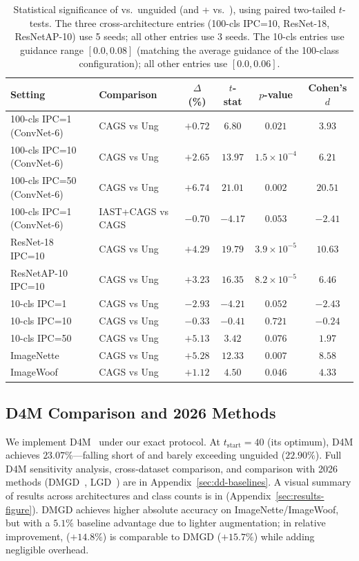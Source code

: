 \begin{table}[t]
\centering
\footnotesize
\caption{Statistical significance of \cags{} vs.\ unguided (and \iast{}+\cags{} vs.\ \cags{}), using paired two-tailed $t$-tests. The three cross-architecture entries (100-cls IPC=10, ResNet-18, ResNetAP-10) use 5 seeds; all other entries use 3 seeds. The 10-cls entries use guidance range $[0.0, 0.08]$ (matching the average guidance of the 100-class configuration); all other entries use $[0.0, 0.06]$.}
\label{tab:significance}
\begin{tabular}{llcccc}
\toprule
\textbf{Setting} & \textbf{Comparison} & \textbf{$\Delta$ (\%)} & \textbf{$t$-stat} & \textbf{$p$-value} & \textbf{Cohen's $d$} \\
\midrule
100-cls IPC=1 (ConvNet-6) & CAGS vs Ung & $+0.72$ & $6.80$ & $0.021$ & $3.93$ \\
100-cls IPC=10 (ConvNet-6) & CAGS vs Ung & $+2.65$ & $13.97$ & $1.5\!\times\!10^{-4}$ & $6.21$ \\
100-cls IPC=50 (ConvNet-6) & CAGS vs Ung & $+6.74$ & $21.01$ & $0.002$ & $20.51$ \\
100-cls IPC=1 (ConvNet-6) & IAST+CAGS vs CAGS & $-0.70$ & $-4.17$ & $0.053$ & $-2.41$ \\
\midrule
ResNet-18 IPC=10 & CAGS vs Ung & $+4.29$ & $19.79$ & $3.9\!\times\!10^{-5}$ & $10.63$ \\
ResNetAP-10 IPC=10 & CAGS vs Ung & $+3.23$ & $16.35$ & $8.2\!\times\!10^{-5}$ & $6.46$ \\
\midrule
10-cls IPC=1 & CAGS vs Ung & $-2.93$ & $-4.21$ & $0.052$ & $-2.43$ \\
10-cls IPC=10 & CAGS vs Ung & $-0.33$ & $-0.41$ & $0.721$ & $-0.24$ \\
10-cls IPC=50 & CAGS vs Ung & $+5.13$ & $3.42$ & $0.076$ & $1.97$ \\
\midrule
ImageNette & CAGS vs Ung & $+5.28$ & $12.33$ & $0.007$ & $8.58$ \\
ImageWoof & CAGS vs Ung & $+1.12$ & $4.50$ & $0.046$ & $4.33$ \\
\bottomrule
\end{tabular}
\end{table}

\subsection{D4M Comparison and 2026 Methods}
\label{sec:d4m-summary}

We implement D4M~\cite{su2024dataset} under our exact protocol. At $t_{\text{start}}{=}40$ (its optimum), D4M achieves $23.07\%$---falling short of \cags{} and barely exceeding unguided ($22.90\%$). Full D4M sensitivity analysis, cross-dataset comparison, and comparison with 2026 methods (DMGD~\cite{wang2026dmgd}, LGD~\cite{chansantiago2026learnabilityguided}) are in Appendix~\ref{sec:dd-baselines}. A visual summary of results across architectures and class counts is in  (Appendix~\ref{sec:results-figure}). DMGD achieves higher absolute accuracy on ImageNette/ImageWoof, but with a $5.1\%$ baseline advantage due to lighter augmentation; in relative improvement, \cags{} ($+14.8\%$) is comparable to DMGD ($+15.7\%$) while adding negligible overhead.

